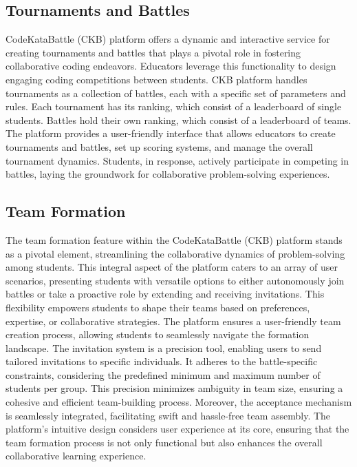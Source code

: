 \subsection*{Tournaments and Battles}
CodeKataBattle (CKB) platform offers a dynamic and interactive service for creating tournaments and battles that plays a pivotal role in fostering collaborative coding endeavors. 
Educators leverage this functionality to design engaging coding competitions between students.
CKB platform handles tournaments as a collection of battles, each with a specific set of parameters and rules. Each tournament has its ranking, which consist of a leaderboard of single students.
Battles hold their own ranking, which consist of a leaderboard of teams. 
The platform provides a user-friendly interface that allows educators to create tournaments and battles, set up scoring systems, and manage the overall tournament dynamics.
Students, in response, actively participate in competing in battles, laying the groundwork for collaborative problem-solving experiences.

\subsection*{Team Formation}
The team formation feature within the CodeKataBattle (CKB) platform stands as a pivotal element, streamlining the collaborative dynamics of problem-solving among students. 
This integral aspect of the platform caters to an array of user scenarios, presenting students with versatile options to either autonomously join battles or take a proactive role by extending and receiving invitations. 
This flexibility empowers students to shape their teams based on preferences, expertise, or collaborative strategies.
The platform ensures a user-friendly team creation process, allowing students to seamlessly navigate the formation landscape. 
The invitation system is a precision tool, enabling users to send tailored invitations to specific individuals. 
It adheres to the battle-specific constraints, considering the predefined minimum and maximum number of students per group. 
This precision minimizes ambiguity in team size, ensuring a cohesive and efficient team-building process.
Moreover, the acceptance mechanism is seamlessly integrated, facilitating swift and hassle-free team assembly. 
The platform's intuitive design considers user experience at its core, ensuring that the team formation process is not only functional but also enhances the overall collaborative learning experience.

